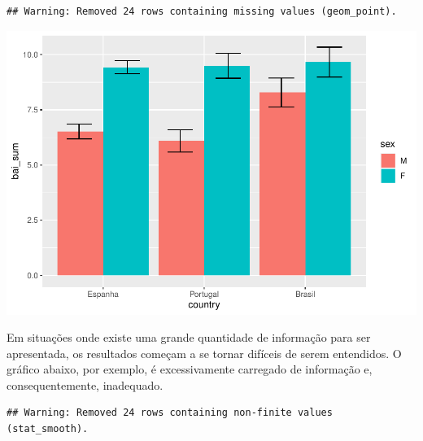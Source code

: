 \documentclass[
]{book}
\newenvironment{Shaded}{\begin{snugshade}}{\end{snugshade}}
\newcommand{\DataTypeTok}[1]{\textcolor[rgb]{0.13,0.29,0.53}{#1}}
\newcommand{\KeywordTok}[1]{\textcolor[rgb]{0.13,0.29,0.53}{\textbf{#1}}}
\newcommand{\NormalTok}[1]{#1}
\newcommand{\OperatorTok}[1]{\textcolor[rgb]{0.81,0.36,0.00}{\textbf{#1}}}
\newcommand{\StringTok}[1]{\textcolor[rgb]{0.31,0.60,0.02}{#1}}
\begin{document}
\begin{verbatim}
## Warning: Removed 24 rows containing missing values (geom_point).
\end{verbatim}

\includegraphics{gitbook-demo_files/figure-latex/unnamed-chunk-25-1.pdf}

Em situações onde existe uma grande quantidade de informação para ser apresentada, os resultados começam a se tornar difíceis de serem entendidos. O gráfico abaixo, por exemplo, é excessivamente carregado de informação e, consequentemente, inadequado.

\begin{Shaded}
\end{Shaded}

\begin{verbatim}
## Warning: Removed 24 rows containing non-finite values (stat_smooth).
\end{verbatim}
\end{document}
